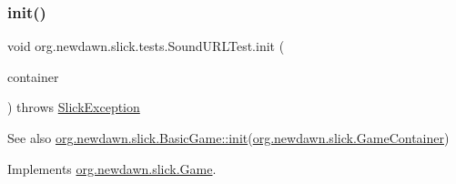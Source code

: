 \subsubsection{\texorpdfstring{init()}{init()}}
{\footnotesize\ttfamily void org.\+newdawn.\+slick.\+tests.\+Sound\+U\+R\+L\+Test.\+init (\begin{DoxyParamCaption}\item[{\mbox{\hyperlink{classorg_1_1newdawn_1_1slick_1_1_game_container}{Game\+Container}}}]{container }\end{DoxyParamCaption}) throws \mbox{\hyperlink{classorg_1_1newdawn_1_1slick_1_1_slick_exception}{Slick\+Exception}}\hspace{0.3cm}{\ttfamily [inline]}}

\begin{DoxySeeAlso}{See also}
\mbox{\hyperlink{classorg_1_1newdawn_1_1slick_1_1_basic_game_a8af0900217e4d389249f71367b22d114}{org.\+newdawn.\+slick.\+Basic\+Game\+::init}}(\mbox{\hyperlink{classorg_1_1newdawn_1_1slick_1_1_game_container}{org.\+newdawn.\+slick.\+Game\+Container}}) 
\end{DoxySeeAlso}


Implements \mbox{\hyperlink{interfaceorg_1_1newdawn_1_1slick_1_1_game_ad2dd6affab08bb8fdb5fab0815957b7a}{org.\+newdawn.\+slick.\+Game}}.


